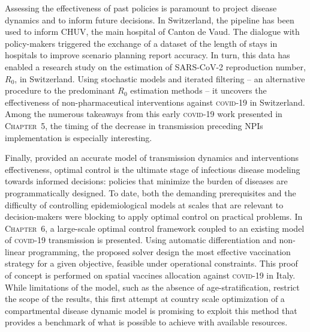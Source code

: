 Assessing the effectiveness of past policies is paramount to project disease dynamics and to inform future decisions. In Switzerland, the pipeline has been used to inform CHUV, the main hospital of Canton de Vaud. The dialogue with policy-makers triggered the exchange of a dataset of the length of stays in hospitals to improve scenario planning report accuracy. In turn, this data has enabled a research study on the estimation of SARS-CoV-2 reproduction number, $R_0$, in Switzerland. Using stochastic models and iterated filtering -- an alternative procedure to the predominant $R_0$ estimation methods\cite{Gostic:PracticalConsiderationsMeasuring:2020a,Pasetto:RangeReproductionNumber:2020} -- it uncovers the effectiveness of non-pharmaceutical interventions against \textsc{covid-19} in Switzerland. Among the numerous takeaways from this early \textsc{covid}-19 work presented in \textsc{Chapter~5}, the timing of the decrease in transmission preceding NPIs implementation is especially interesting. %

Finally, provided an accurate model of transmission dynamics and interventions effectiveness, optimal control is the ultimate stage of infectious disease modeling towards informed decisions: policies that minimize the burden of diseases are programmatically designed. To date, both the demanding prerequisites and the difficulty of controlling epidemiological models at scales that are relevant to decision-makers were blocking to apply optimal control on practical problems. In \textsc{Chapter~6}, a large-scale optimal control framework coupled to an existing model of \textsc{covid}-19 transmission\cite{Gatto:SpreadDynamicsCOVID19:2020,Bertuzzo:GeographyCOVID19Spread:2020} is presented.  Using automatic differentiation and non-linear programming, the proposed solver design the most effective vaccination strategy for a given objective, feasible under operational constraints. This proof of concept is performed on spatial vaccines allocation against \textsc{covid}-19 in Italy. While limitations of the model, such as the absence of age-stratification, restrict the scope of the results, this first attempt at country scale optimization of a compartmental disease dynamic model is promising to exploit this method that provides a benchmark of what is possible to achieve with available resources.%


